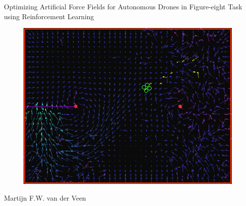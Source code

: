 \documentclass[11pt]{article}
\begin{document}

\thispagestyle{empty} %

\vspace{2.5cm}
\begin{center}
\begin{huge}
Optimizing Artificial Force Fields for Autonomous Drones in Figure-eight Task using Reinforcement Learning
\end{huge}

\vspace{0.5cm}

  \begin{figure}[h!]
    \includegraphics[width=1.0\textwidth]{img/front_image}
  \end{figure}

\vspace{1.5cm}
Martijn F.W. van der Veen

\vspace{1.5cm}

\end{center}



\end{document}
